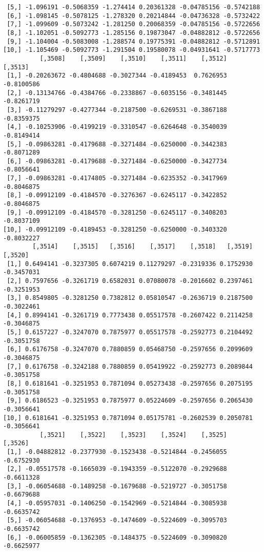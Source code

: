 \documentclass[
  letterpaper,
  DIV=11,
  numbers=noendperiod]{scrreprt}
\begin{document}
\begin{verbatim}
 [5,] -1.096191 -0.5068359 -1.274414 0.20361328 -0.04785156 -0.5742188
 [6,] -1.098145 -0.5078125 -1.278320 0.20214844 -0.04736328 -0.5732422
 [7,] -1.099609 -0.5073242 -1.281250 0.20068359 -0.04785156 -0.5722656
 [8,] -1.102051 -0.5092773 -1.285156 0.19873047 -0.04882812 -0.5722656
 [9,] -1.104004 -0.5083008 -1.288574 0.19775391 -0.04882812 -0.5712891
[10,] -1.105469 -0.5092773 -1.291504 0.19580078 -0.04931641 -0.5717773
          [,3508]    [,3509]    [,3510]    [,3511]    [,3512]    [,3513]
 [1,] -0.20263672 -0.4804688 -0.3027344 -0.4189453  0.7626953 -0.8100586
 [2,] -0.13134766 -0.4384766 -0.2338867 -0.6035156 -0.3481445 -0.8261719
 [3,] -0.11279297 -0.4277344 -0.2187500 -0.6269531 -0.3867188 -0.8359375
 [4,] -0.10253906 -0.4199219 -0.3310547 -0.6264648 -0.3540039 -0.8149414
 [5,] -0.09863281 -0.4179688 -0.3271484 -0.6250000 -0.3442383 -0.8071289
 [6,] -0.09863281 -0.4179688 -0.3271484 -0.6250000 -0.3427734 -0.8056641
 [7,] -0.09863281 -0.4174805 -0.3271484 -0.6235352 -0.3417969 -0.8046875
 [8,] -0.09912109 -0.4184570 -0.3276367 -0.6245117 -0.3422852 -0.8046875
 [9,] -0.09912109 -0.4184570 -0.3281250 -0.6245117 -0.3408203 -0.8037109
[10,] -0.09912109 -0.4189453 -0.3281250 -0.6250000 -0.3403320 -0.8032227
        [,3514]    [,3515]   [,3516]    [,3517]    [,3518]   [,3519]    [,3520]
 [1,] 0.6494141 -0.3237305 0.6074219 0.11279297 -0.2319336 0.1752930 -0.3457031
 [2,] 0.7597656 -0.3261719 0.6582031 0.07080078 -0.2016602 0.2397461 -0.3251953
 [3,] 0.8549805 -0.3281250 0.7382812 0.05810547 -0.2636719 0.2187500 -0.3022461
 [4,] 0.8994141 -0.3261719 0.7773438 0.05517578 -0.2607422 0.2114258 -0.3046875
 [5,] 0.6157227 -0.3247070 0.7875977 0.05517578 -0.2592773 0.2104492 -0.3051758
 [6,] 0.6176758 -0.3247070 0.7880859 0.05468750 -0.2597656 0.2099609 -0.3046875
 [7,] 0.6176758 -0.3242188 0.7880859 0.05419922 -0.2592773 0.2089844 -0.3051758
 [8,] 0.6181641 -0.3251953 0.7871094 0.05273438 -0.2597656 0.2075195 -0.3051758
 [9,] 0.6186523 -0.3251953 0.7875977 0.05224609 -0.2597656 0.2065430 -0.3056641
[10,] 0.6181641 -0.3251953 0.7871094 0.05175781 -0.2602539 0.2050781 -0.3056641
          [,3521]    [,3522]    [,3523]    [,3524]    [,3525]    [,3526]
 [1,] -0.04882812 -0.2377930 -0.1523438 -0.5214844 -0.2456055 -0.6752930
 [2,] -0.05517578 -0.1665039 -0.1943359 -0.5122070 -0.2929688 -0.6611328
 [3,] -0.06054688 -0.1489258 -0.1679688 -0.5219727 -0.3051758 -0.6679688
 [4,] -0.05957031 -0.1406250 -0.1542969 -0.5214844 -0.3085938 -0.6635742
 [5,] -0.06054688 -0.1376953 -0.1474609 -0.5224609 -0.3095703 -0.6635742
 [6,] -0.06005859 -0.1362305 -0.1484375 -0.5224609 -0.3090820 -0.6625977

\end{verbatim}
\end{document}
